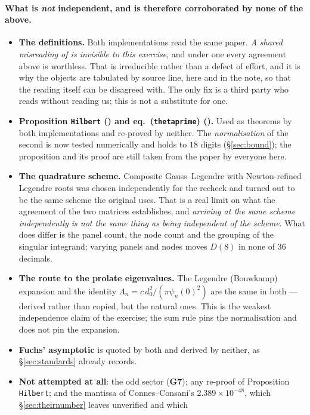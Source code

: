 \documentclass[11pt,a4paper]{article}
\theoremstyle{plain}
\theoremstyle{definition}
\theoremstyle{remark}
\newcommand{\file}[1]{\path{#1}}
\begin{document}
\paragraph{What is \emph{not} independent, and is therefore corroborated by none
of the above.}
\begin{itemize}\itemsep1pt
\item \textbf{The definitions.}  Both implementations read the same paper.
\emph{A shared misreading of \cite{CC2023} is invisible to this exercise}, and
under one every agreement above is worthless.  That is irreducible rather than a
defect of effort, and it is why the objects are tabulated by source line, here
and in the note, so that the reading itself can be disagreed with.  The only fix
is a third party who reads \cite{CC2023} without reading us; this is not a
substitute for one.
\item \textbf{Proposition \texttt{Hilbert} (\file{:289}) and eq.\
(\texttt{thetaprime}) (\file{:261}).}  Used as theorems by both implementations
and re-proved by neither.  The \emph{normalisation} of the second is now tested
numerically and holds to $18$ digits (\S\ref{sec:bound}); the proposition and
its proof are still taken from the paper by everyone here.
\item \textbf{The quadrature scheme.}  Composite Gauss--Legendre with
Newton-refined Legendre roots was chosen independently for the recheck and turned
out to be the same scheme the original uses.  That is a real limit on what the
agreement of the two matrices establishes, and \emph{arriving at the same scheme
independently is not the same thing as being independent of the scheme}.  What
does differ is the panel count, the node count and the grouping of the singular
integrand; varying panels and nodes moves $D(8)$ in none of $36$ decimals.
\item \textbf{The route to the prolate eigenvalues.}  The Legendre (Bouwkamp)
expansion and the identity $\Lambda_n=c\,d_0^2/(\pi\psi_n(0)^2)$ are the same in
both --- derived rather than copied, but the natural ones.  This is the weakest
independence claim of the exercise; the sum rule pins the normalisation and does
not pin the expansion.
\item \textbf{Fuchs' asymptotic} is quoted by both and derived by neither, as
\S\ref{sec:standards} already records.
\item \textbf{Not attempted at all}: the odd sector (\textbf{G7}); any re-proof
of Proposition \texttt{Hilbert}; and the mantissa of Connes--Consani's
$2.389\times10^{-48}$, which \S\ref{sec:theirnumber} leaves unverified and which

\end{itemize}
\end{document}
